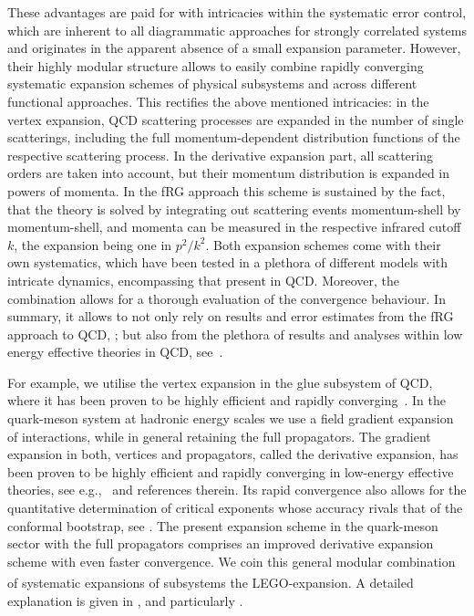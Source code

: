 \documentclass[aps,twocolumn,prd,superscriptaddress]{revtex4-2}
\newcommand{\LEGO}{LEGO\textsuperscript{\textregistered}}
\begin{document}
These advantages are paid for with intricacies within the systematic error control, which are inherent to all diagrammatic approaches for strongly correlated systems and originates in the apparent absence of a small expansion parameter. However, their highly modular structure allows to easily combine rapidly converging systematic expansion schemes of physical subsystems and across different functional approaches. This rectifies the above mentioned intricacies: in the vertex expansion, QCD scattering processes are expanded in the number of single scatterings, including the full momentum-dependent distribution functions of the respective scattering process. In the derivative expansion part, all scattering orders are taken into account, but their momentum distribution is expanded in powers of momenta. In the fRG approach this scheme is sustained by the fact, that the theory is solved by integrating out scattering events momentum-shell by momentum-shell, and momenta can be measured in the respective infrared cutoff $k$, the expansion being one in $p^2/k^2$. Both expansion schemes come with their own systematics, which have been tested in a plethora of different models with intricate dynamics, encompassing that present in QCD. Moreover, the combination allows for a thorough evaluation of the convergence behaviour. In summary, it allows to not only rely on results and error estimates from the fRG approach to QCD, \cite{Gies:2002hq, Pawlowski:2003hq, Fischer:2004uk, Braun:2008pi, Braun:2009gm, Mitter:2014wpa, Braun:2014ata, Rennecke:2015eba, Cyrol:2016tym, Cyrol:2017ewj, Cyrol:2017qkl, Corell:2018yil, Fu:2019hdw, Braun:2020ada}; but also from the plethora of results and analyses within low energy effective theories in QCD, see~\cite{Dupuis:2020fhh}. 

For example, we utilise the vertex expansion in the glue subsystem of QCD, where it has been proven to be highly efficient and rapidly converging~\cite{Cyrol:2016tym}. In the quark-meson system at hadronic energy scales we use a field gradient expansion of interactions, while in general retaining the full propagators. The gradient expansion in both, vertices and propagators, called the derivative expansion, has been proven to be highly efficient and rapidly converging in low-energy effective theories, see e.g.,~\cite{Dupuis:2020fhh, Fu:2022gou} and references therein. Its rapid convergence also allows for the quantitative determination of critical exponents whose accuracy rivals that of the conformal bootstrap, see \cite{Balog:2019rrg, Dupuis:2020fhh}. The present expansion scheme in the quark-meson sector with the full propagators comprises an improved derivative expansion scheme with even faster convergence. We coin this general modular combination of systematic expansions of subsystems the \LEGO-expansion. A detailed explanation is given in , and particularly .
\end{document}
